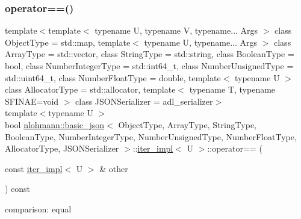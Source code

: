 \subsubsection{\texorpdfstring{operator==()}{operator==()}}
{\footnotesize\ttfamily template$<$template$<$ typename U, typename V, typename... Args $>$ class Object\+Type = std\+::map, template$<$ typename U, typename... Args $>$ class Array\+Type = std\+::vector, class String\+Type  = std\+::string, class Boolean\+Type  = bool, class Number\+Integer\+Type  = std\+::int64\+\_\+t, class Number\+Unsigned\+Type  = std\+::uint64\+\_\+t, class Number\+Float\+Type  = double, template$<$ typename U $>$ class Allocator\+Type = std\+::allocator, template$<$ typename T, typename S\+F\+I\+N\+A\+E=void $>$ class J\+S\+O\+N\+Serializer = adl\+\_\+serializer$>$ \\
template$<$typename U $>$ \\
bool \mbox{\hyperlink{classnlohmann_1_1basic__json}{nlohmann\+::basic\+\_\+json}}$<$ Object\+Type, Array\+Type, String\+Type, Boolean\+Type, Number\+Integer\+Type, Number\+Unsigned\+Type, Number\+Float\+Type, Allocator\+Type, J\+S\+O\+N\+Serializer $>$\+::\mbox{\hyperlink{classnlohmann_1_1basic__json_1_1iter__impl}{iter\+\_\+impl}}$<$ U $>$\+::operator== (\begin{DoxyParamCaption}\item[{const \mbox{\hyperlink{classnlohmann_1_1basic__json_1_1iter__impl}{iter\+\_\+impl}}$<$ U $>$ \&}]{other }\end{DoxyParamCaption}) const\hspace{0.3cm}{\ttfamily [inline]}}



comparison\+: equal 

